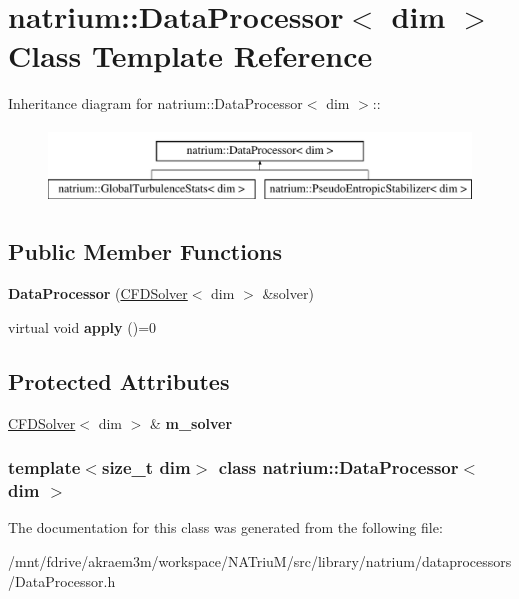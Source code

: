 \hypertarget{classnatrium_1_1DataProcessor}{
\section{natrium::DataProcessor$<$ dim $>$ Class Template Reference}
\label{classnatrium_1_1DataProcessor}
}
Inheritance diagram for natrium::DataProcessor$<$ dim $>$::\begin{figure}[H]
\begin{center}
\leavevmode
\includegraphics[height=2cm]{classnatrium_1_1DataProcessor}
\end{center}
\end{figure}
\subsection*{Public Member Functions}
\begin{DoxyCompactItemize}
\item 
\hypertarget{classnatrium_1_1DataProcessor_a22a635f9a3336b375e8e8345a82f592d}{
{\bfseries DataProcessor} (\hyperlink{classnatrium_1_1CFDSolver}{CFDSolver}$<$ dim $>$ \&solver)}
\label{classnatrium_1_1DataProcessor_a22a635f9a3336b375e8e8345a82f592d}

\item 
\hypertarget{classnatrium_1_1DataProcessor_a82939cd7d981e39d2f4f2483b79e03dd}{
virtual void {\bfseries apply} ()=0}
\label{classnatrium_1_1DataProcessor_a82939cd7d981e39d2f4f2483b79e03dd}

\end{DoxyCompactItemize}
\subsection*{Protected Attributes}
\begin{DoxyCompactItemize}
\item 
\hypertarget{classnatrium_1_1DataProcessor_ae0be34660f37d5ae8bad42b46383d7fe}{
\hyperlink{classnatrium_1_1CFDSolver}{CFDSolver}$<$ dim $>$ \& {\bfseries m\_\-solver}}
\label{classnatrium_1_1DataProcessor_ae0be34660f37d5ae8bad42b46383d7fe}

\end{DoxyCompactItemize}
\subsubsection*{template$<$size\_\-t dim$>$ class natrium::DataProcessor$<$ dim $>$}



The documentation for this class was generated from the following file:\begin{DoxyCompactItemize}
\item 
/mnt/fdrive/akraem3m/workspace/NATriuM/src/library/natrium/dataprocessors/DataProcessor.h\end{DoxyCompactItemize}
